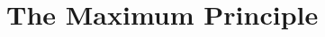 \documentclass[../main.tex]{subfiles}
\begin{document}
\section{The Maximum Principle}
%
\todo{}
\end{document}
